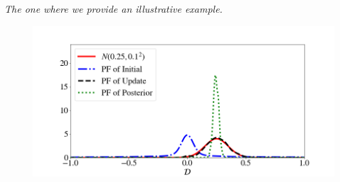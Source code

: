 \begin{frame}{\it The one where we provide an illustrative example.}
\begin{figure}
{{   \includegraphics[width=0.65\linewidth]{figures/bip-vs-sip-pf-20.png}
	 }}
 \label{fig:bayes-comparison-convergence}
\end{figure}


\end{frame}
